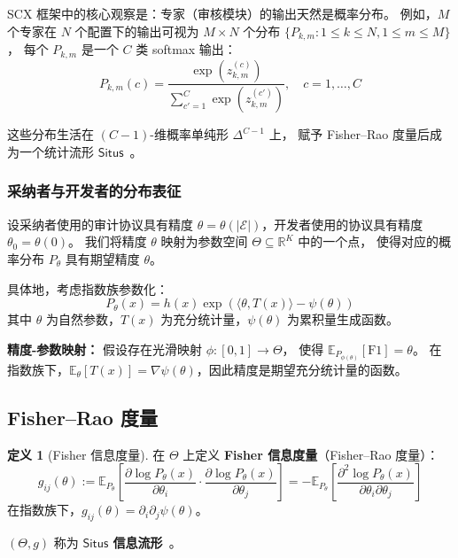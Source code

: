 \documentclass[12pt,a4paper]{article}
\theoremstyle{definition}
\newtheorem{definition}{定义}[section]
\theoremstyle{remark}
\newcommand{\R}{\mathbb{R}}
\newcommand{\E}{\mathbb{E}}
\newcommand{\Fisher}{g}
\newcommand{\Situs}{\mathsf{Situs}}
\begin{document}
SCX 框架中的核心观察是：专家（审核模块）的输出天然是概率分布。
例如，$M$ 个专家在 $N$ 个配置下的输出可视为 $M \times N$ 个分布 $\{P_{k,m} : 1 \leq k \leq N, 1 \leq m \leq M\}$，
每个 $P_{k,m}$ 是一个 $C$ 类 softmax 输出：
\begin{equation}
    P_{k,m}(c) = \frac{\exp(z_{k,m}^{(c)})}{\sum_{c'=1}^{C} \exp(z_{k,m}^{(c')})}, \quad c = 1,\dots,C
\end{equation}

这些分布生活在 $(C-1)$-维概率单纯形 $\Delta^{C-1}$ 上，
赋予 Fisher--Rao 度量后成为一个统计流形 $\Situs$~\cite{amari2016information}。

\subsubsection{采纳者与开发者的分布表征}

设采纳者使用的审计协议具有精度 $\theta = \theta(|\mathcal{E}|)$，开发者使用的协议具有精度 $\theta_0 = \theta(0)$。
我们将精度 $\theta$ 映射为参数空间 $\Theta \subseteq \R^K$ 中的一个点，
使得对应的概率分布 $P_\theta$ 具有期望精度 $\theta$。

具体地，考虑指数族参数化：
\begin{equation}
    P_\theta(x) = h(x) \exp\left( \langle \theta, T(x) \rangle - \psi(\theta) \right) \label{eq:exp_fam}
\end{equation}
其中 $\theta$ 为自然参数，$T(x)$ 为充分统计量，$\psi(\theta)$ 为累积量生成函数。

\textbf{精度-参数映射：} 假设存在光滑映射 $\phi: [0,1] \to \Theta$，
使得 $\E_{P_{\phi(\theta)}}[\text{F1}] = \theta$。
在指数族下，$\E_\theta[T(x)] = \nabla \psi(\theta)$，因此精度是期望充分统计量的函数。

\subsection{Fisher--Rao 度量}\label{sec:fisher_metric}

\begin{definition}[Fisher 信息度量]
在 $\Theta$ 上定义 \textbf{Fisher 信息度量}（Fisher--Rao 度量）：
\begin{equation}
    \Fisher_{ij}(\theta) := \E_{P_\theta}\left[
        \frac{\partial \log P_\theta(x)}{\partial \theta_i} \cdot
        \frac{\partial \log P_\theta(x)}{\partial \theta_j}
    \right]
    = -\E_{P_\theta}\left[
        \frac{\partial^2 \log P_\theta(x)}{\partial \theta_i \partial \theta_j}
    \right] \label{eq:fisher_metric}
\end{equation}
在指数族下，$\Fisher_{ij}(\theta) = \partial_i \partial_j \psi(\theta)$。

$(\Theta, \Fisher)$ 称为 \textbf{$\Situs$ 信息流形}~\cite{scx_gauge_formalized}。
\end{definition}
\end{document}
